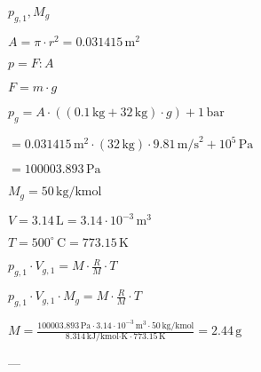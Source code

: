 \( p_{g,1}, M_g \)  

\( A = \pi \cdot r^2 = 0.031415 \, \text{m}^2 \)  

\( p = F : A \)  

\( F = m \cdot g \)  

\( p_{g} = A \cdot \left( (0.1 \, \text{kg} + 32 \, \text{kg}) \cdot g \right) + 1 \, \text{bar} \)  

\( = 0.031415 \, \text{m}^2 \cdot (32 \, \text{kg}) \cdot 9.81 \, \text{m/s}^2 + 10^5 \, \text{Pa} \)  

\( = 100003.893 \, \text{Pa} \)  

\( M_g = 50 \, \text{kg/kmol} \)  

\( V = 3.14 \, \text{L} = 3.14 \cdot 10^{-3} \, \text{m}^3 \)  

\( T = 500^\circ \, \text{C} = 773.15 \, \text{K} \)  

\( p_{g,1} \cdot V_{g,1} = M \cdot \frac{R}{M} \cdot T \)  

\( p_{g,1} \cdot V_{g,1} \cdot M_g = M \cdot \frac{R}{M} \cdot T \)  

\( M = \frac{100003.893 \, \text{Pa} \cdot 3.14 \cdot 10^{-3} \, \text{m}^3 \cdot 50 \, \text{kg/kmol}}{8.314 \, \text{kJ/kmol·K} \cdot 773.15 \, \text{K}} = 2.44 \, \text{g} \)  

---